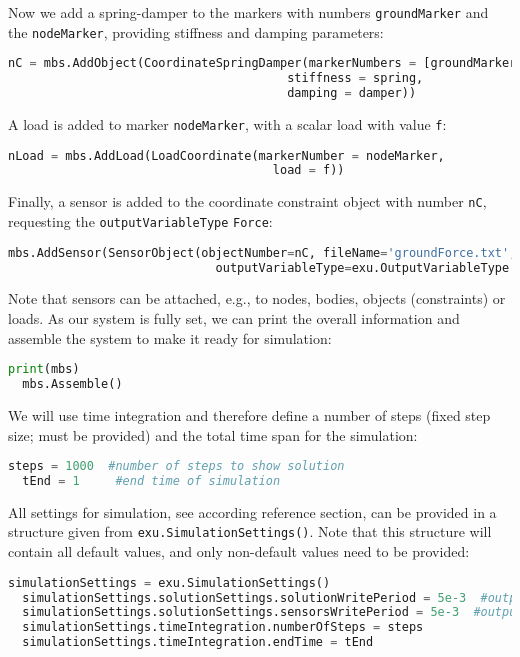 Now we add a spring-damper to the markers with numbers \texttt{groundMarker} and the \texttt{nodeMarker}, providing stiffness and damping parameters:
\begin{lstlisting}[language=Python, firstnumber=29]
  nC = mbs.AddObject(CoordinateSpringDamper(markerNumbers = [groundMarker, nodeMarker], 
                                       stiffness = spring, 
                                       damping = damper)) 
\end{lstlisting}
%
A load is added to marker \texttt{nodeMarker}, with a scalar load with value \texttt{f}:
\begin{lstlisting}[language=Python, firstnumber=32]
  nLoad = mbs.AddLoad(LoadCoordinate(markerNumber = nodeMarker, 
                                     load = f))
\end{lstlisting}
%
Finally, a sensor is added to the coordinate constraint object with number \texttt{nC}, requesting the \texttt{outputVariableType} \texttt{Force}:
\begin{lstlisting}[language=Python, firstnumber=34]
  mbs.AddSensor(SensorObject(objectNumber=nC, fileName='groundForce.txt', 
                             outputVariableType=exu.OutputVariableType.Force))
\end{lstlisting}
Note that sensors can be attached, e.g., to nodes, bodies, objects (constraints) or loads.
%
As our system is fully set, we can print the overall information and assemble the system to make it ready for simulation:
\begin{lstlisting}[language=Python, firstnumber=36]
  print(mbs)
  mbs.Assemble()
\end{lstlisting}
%
We will use time integration and therefore define a number of steps (fixed step size; must be provided) and the total time span for the simulation:
\begin{lstlisting}[language=Python, firstnumber=38]
  steps = 1000  #number of steps to show solution
  tEnd = 1     #end time of simulation
\end{lstlisting}
%
All settings for simulation, see according reference section, can be provided in a structure given from \texttt{exu.SimulationSettings()}. Note that this structure will contain all default values, and only non-default values need to be provided:
\begin{lstlisting}[language=Python, firstnumber=40]
  simulationSettings = exu.SimulationSettings()
  simulationSettings.solutionSettings.solutionWritePeriod = 5e-3  #output interval general
  simulationSettings.solutionSettings.sensorsWritePeriod = 5e-3  #output interval of sensors
  simulationSettings.timeIntegration.numberOfSteps = steps
  simulationSettings.timeIntegration.endTime = tEnd
\end{lstlisting}
